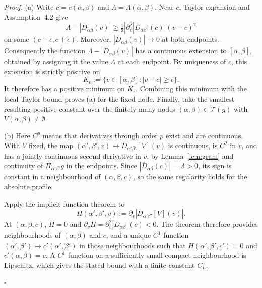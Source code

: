 \documentclass[12pt, a4paper]{article}
\newcommand{\qed}{\hfill$\square$}
\newenvironment{proof}[1][Proof]{\par\noindent\textit{#1.}\space}{\qed\par\medskip}
\newcommand{\assnondeg}{Assumption~4.2}
\begin{document}
\begin{proof}
(a) Write $c=c(\alpha,\beta)$ and
$\Lambda=\Lambda(\alpha,\beta)$. Near $c$, Taylor expansion and
\assnondeg{} give
\[
\Lambda-|\bar D_{\alpha\beta}(v)|
\ge \tfrac13|\partial_v^2|\bar D_{\alpha\beta}|(c)|(v-c)^2
\]
on some $(c-\epsilon,c+\epsilon)$. Moreover,
$|\bar D_{\alpha\beta}(v)|\to0$ at both endpoints. Consequently the function
$\Lambda-|\bar D_{\alpha\beta}(v)|$ has a continuous extension to
$[\alpha,\beta]$, obtained by assigning it the value $\Lambda$ at each
endpoint. By uniqueness of $c$, this extension is strictly positive on
\[
K_{\epsilon}:=\{v\in[\alpha,\beta]:|v-c|\ge\epsilon\}.
\]
It therefore has a positive minimum on $K_\epsilon$. Combining this minimum
with the local Taylor bound proves (a) for the fixed node. Finally, take the
smallest resulting positive constant over the finitely many nodes
$(\alpha,\beta)\in\mathcal T(g)$ with $V(\alpha,\beta)\ne\emptyset$.

(b) Here $C^p$ means that derivatives through order $p$ exist and are
continuous. With $V$ fixed, the map
$(\alpha',\beta',v)\mapsto\bar D_{\alpha'\beta'}[V](v)$ is continuous, is
$C^2$ in $v$, and has a jointly continuous second derivative in $v$, by
Lemma~\ref{lem:gram} and continuity of
$\Pi^\perp_{\alpha'\beta'}g$ in the endpoints. Since
$|\bar D_{\alpha\beta}(c)|=\Lambda>0$, its sign is constant in a neighbourhood
of $(\alpha,\beta,c)$, so the same regularity holds for the absolute profile.

Apply the implicit function theorem to
\[
H(\alpha',\beta',v):=\partial_v
|\bar D_{\alpha'\beta'}[V](v)|.
\]
At $(\alpha,\beta,c)$, $H=0$ and
$\partial_vH=\partial_v^2|\bar D_{\alpha\beta}|(c)<0$. The theorem therefore
provides neighbourhoods of $(\alpha,\beta)$ and $c$, and a unique $C^1$
function $(\alpha',\beta')\mapsto c'(\alpha',\beta')$ in those neighbourhoods
such that $H(\alpha',\beta',c')=0$ and $c'(\alpha,\beta)=c$. A $C^1$ function
on a sufficiently small compact neighbourhood is Lipschitz, which gives the
stated bound with a finite constant $C_L$.


\end{proof}
\end{document}
